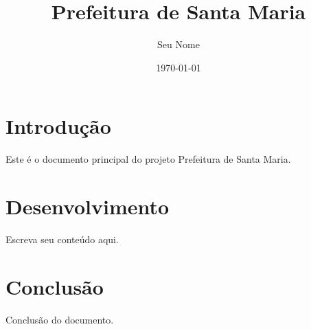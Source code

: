 \documentclass[12pt,a4paper]{article}
\title{Prefeitura de Santa Maria}
\author{Seu Nome}
\date{\today}
\begin{document}
\maketitle

\section{Introdução}

Este é o documento principal do projeto Prefeitura de Santa Maria.

\section{Desenvolvimento}

Escreva seu conteúdo aqui.

\section{Conclusão}

Conclusão do documento.
\end{document}
